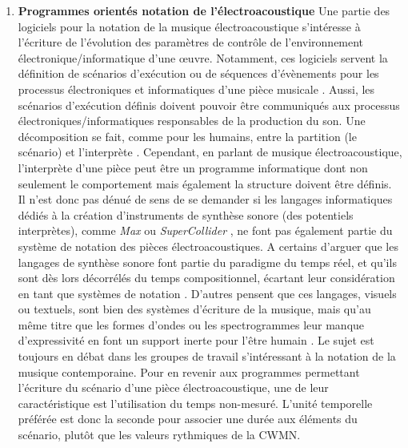 \begin{enumerate}[label=(\arabic*)]
	\item \textbf{Programmes orientés notation de l'électroacoustique} Une partie des logiciels pour la notation de la musique électroacoustique s'intéresse à l'écriture de l'évolution des paramètres de contrôle de l'environnement électronique/informatique d'une œuvre. Notamment, ces logiciels servent la définition de scénarios d'exécution ou de séquences d'évènements pour les processus électroniques et informatiques d'une pièce musicale \cite{arias2017, coduys2003, cont2008}. Aussi, les scénarios d'exécution définis doivent pouvoir être communiqués aux processus électroniques/informatiques responsables de la production du son. Une décomposition se fait, comme pour les humains, entre la partition (le scénario) et l'interprète \cite{pope1986}.
	Cependant, en parlant de musique électroacoustique, l'interprète d'une pièce peut être un programme informatique dont non seulement le comportement mais également la structure doivent être définis. Il n'est donc pas dénué de sens de se demander si les langages informatiques dédiés à la création d'instruments de synthèse sonore (des potentiels interprètes), comme \textit{Max} \cite{puckette1991} ou \textit{SuperCollider} \cite{mccartney1996}, ne font pas également partie du système de notation des pièces électroacoustiques. A certains d'arguer que les langages de synthèse sonore font partie du paradigme du temps réel, et qu'ils sont dès lors décorrélés du temps compositionnel, écartant leur considération en tant que systèmes de notation \cite{risset1999}. D'autres pensent que ces langages, visuels ou textuels, sont bien des systèmes d'écriture de la musique, mais qu'au même titre que les formes d'ondes ou les spectrogrammes leur manque d'expressivité en font un support inerte pour l'être humain \cite{gottfried2017}.
	Le sujet est toujours en débat dans les groupes de travail s'intéressant à la notation de la musique contemporaine.
	Pour en revenir aux programmes permettant l'écriture du \og scénario \fg d'une pièce électroacoustique, une de leur caractéristique est l'utilisation du temps non-mesuré. L'unité temporelle préférée est donc la seconde pour associer une durée aux éléments du scénario, plutôt que les valeurs rythmiques de la CWMN.
	

\end{enumerate}
